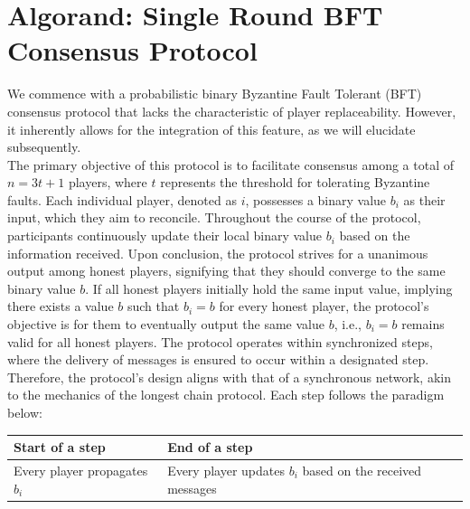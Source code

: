 \documentclass{report}
\begin{document}
\section{Algorand: Single Round BFT Consensus Protocol}
We commence with a probabilistic binary Byzantine Fault Tolerant (BFT) consensus protocol that lacks the characteristic of player replaceability. However, it inherently allows for the integration of this feature, as we will elucidate subsequently.\\
The primary objective of this protocol is to facilitate consensus among a total of $n = 3t + 1$ players, where $t$ represents the threshold for tolerating Byzantine faults. Each individual player, denoted as $i$, possesses a binary value $b_{i}$ as their input, which they aim to reconcile. Throughout the course of the protocol, participants continuously update their local binary value $b_{i}$ based on the information received. Upon conclusion, the protocol strives for a unanimous output among honest players, signifying that they should converge to the same binary value $b$. If all honest players initially hold the same input value, implying there exists a value $b$ such that $b_{i} = b$ for every honest player, the protocol's objective is for them to eventually output the same value $b$, i.e., $b_{i} = b$ remains valid for all honest players.
The protocol operates within synchronized steps, where the delivery of messages is ensured to occur within a designated step. Therefore, the protocol's design aligns with that of a synchronous network, akin to the mechanics of the longest chain protocol. Each step follows the paradigm below:\\
\begin{table}[htbp]
	\centering
	\begin{tabular}{|>{\centering\arraybackslash}p{4cm}|>{\centering\arraybackslash}p{8cm}|}
		\hline
		Start of a step & End of a step\\
		\hline
		Every player propagates $b_{i}$ & Every player updates $b_{i}$ based on the received messages\\
		\hline
	\end{tabular}
\end{table}
\end{document}
